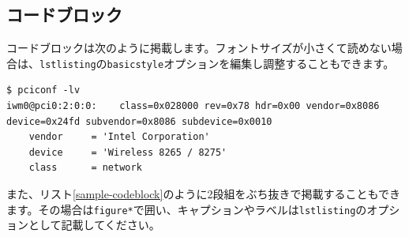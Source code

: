 \begin{table}[t]
  \caption{2段組ぶち抜きで表を掲載する例}
  \label{desktop-configurations-wide}
  \begin{center}
    \end{center}
\end{table}


\subsection{コードブロック}
コードブロックは次のように掲載します。フォントサイズが小さくて読めない場合は、\verb=lstlisting=の\verb=basicstyle=オプションを編集し調整することもできます。

\begin{lstlisting}
$ pciconf -lv
iwm0@pci0:2:0:0:	class=0x028000 rev=0x78 hdr=0x00 vendor=0x8086 device=0x24fd subvendor=0x8086 subdevice=0x0010
    vendor     = 'Intel Corporation'
    device     = 'Wireless 8265 / 8275'
    class      = network
\end{lstlisting}

また、リスト\ref{sample-codeblock}のように2段組をぶち抜きで掲載することもできます。その場合は\verb=figure*=で囲い、キャプションやラベルは\verb=lstlisting=のオプションとして記載してください。

